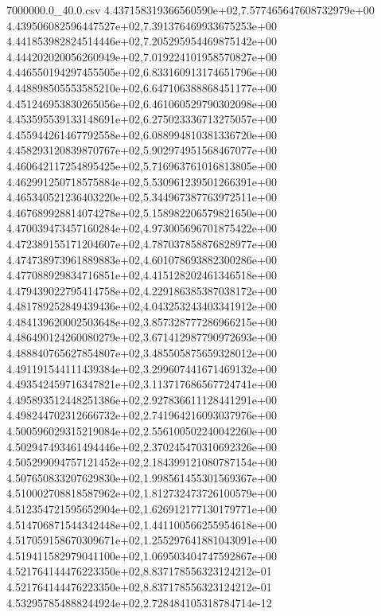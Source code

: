 \begin{filecontents*}{7000000.0_40.0.csv}
4.437158319366560590e+02,7.577465647608732979e+00
4.439506082596447527e+02,7.391376469933675253e+00
4.441853982824514446e+02,7.205295954469875142e+00
4.444202020056260949e+02,7.019224101958570827e+00
4.446550194297455505e+02,6.833160913174651796e+00
4.448898505553585210e+02,6.647106388868451177e+00
4.451246953830265056e+02,6.461060529790302098e+00
4.453595539133148691e+02,6.275023336713275057e+00
4.455944261467792558e+02,6.088994810381336720e+00
4.458293120839870767e+02,5.902974951568467077e+00
4.460642117254895425e+02,5.716963761016813805e+00
4.462991250718575884e+02,5.530961239501266391e+00
4.465340521236403220e+02,5.344967387763972511e+00
4.467689928814074278e+02,5.158982206579821650e+00
4.470039473457160284e+02,4.973005696701875422e+00
4.472389155171204607e+02,4.787037858876828977e+00
4.474738973961889883e+02,4.601078693882300286e+00
4.477088929834716851e+02,4.415128202461346518e+00
4.479439022795414758e+02,4.229186385387038172e+00
4.481789252849439436e+02,4.043253243403341912e+00
4.484139620002503648e+02,3.857328777286966215e+00
4.486490124260080279e+02,3.671412987790972693e+00
4.488840765627854807e+02,3.485505875659328012e+00
4.491191544111439384e+02,3.299607441671469132e+00
4.493542459716347821e+02,3.113717686567724741e+00
4.495893512448251386e+02,2.927836611128441291e+00
4.498244702312666732e+02,2.741964216093037976e+00
4.500596029315219084e+02,2.556100502240042260e+00
4.502947493461494446e+02,2.370245470310692326e+00
4.505299094757121452e+02,2.184399121080787154e+00
4.507650833207629830e+02,1.998561455301569367e+00
4.510002708818587962e+02,1.812732473726100579e+00
4.512354721595652904e+02,1.626912177130179771e+00
4.514706871544342448e+02,1.441100566255954618e+00
4.517059158670309671e+02,1.255297641881043091e+00
4.519411582979041100e+02,1.069503404747592867e+00
4.521764144476223350e+02,8.837178556323124212e-01
4.521764144476223350e+02,8.837178556323124212e-01
4.532957854888244924e+02,2.728484105318784714e-12
\end{filecontents*}

